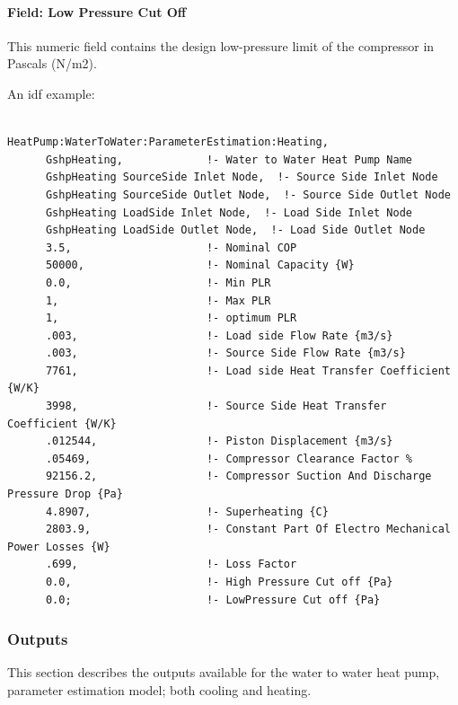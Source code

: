 \paragraph{Field: Low Pressure Cut Off}\label{field-low-pressure-cut-off-1}

This numeric field contains the design low-pressure limit of the compressor in Pascals (N/m2).

An idf example:

\begin{lstlisting}

HeatPump:WaterToWater:ParameterEstimation:Heating,
      GshpHeating,             !- Water to Water Heat Pump Name
      GshpHeating SourceSide Inlet Node,  !- Source Side Inlet Node
      GshpHeating SourceSide Outlet Node,  !- Source Side Outlet Node
      GshpHeating LoadSide Inlet Node,  !- Load Side Inlet Node
      GshpHeating LoadSide Outlet Node,  !- Load Side Outlet Node
      3.5,                     !- Nominal COP
      50000,                   !- Nominal Capacity {W}
      0.0,                     !- Min PLR
      1,                       !- Max PLR
      1,                       !- optimum PLR
      .003,                    !- Load side Flow Rate {m3/s}
      .003,                    !- Source Side Flow Rate {m3/s}
      7761,                    !- Load side Heat Transfer Coefficient {W/K}
      3998,                    !- Source Side Heat Transfer Coefficient {W/K}
      .012544,                 !- Piston Displacement {m3/s}
      .05469,                  !- Compressor Clearance Factor %
      92156.2,                 !- Compressor Suction And Discharge Pressure Drop {Pa}
      4.8907,                  !- Superheating {C}
      2803.9,                  !- Constant Part Of Electro Mechanical Power Losses {W}
      .699,                    !- Loss Factor
      0.0,                     !- High Pressure Cut off {Pa}
      0.0;                     !- LowPressure Cut off {Pa}
\end{lstlisting}

\subsubsection{Outputs}\label{outputs-13-003}

This section describes the outputs available for the water to water heat pump, parameter estimation model; both cooling and heating.


